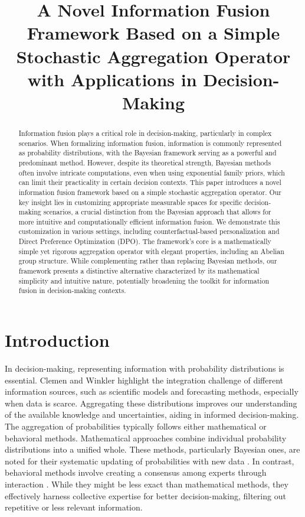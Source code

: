 \documentclass[letterpaper]{article} %
\title{A Novel Information Fusion Framework Based on a Simple Stochastic Aggregation Operator with Applications in Decision-Making}
\theoremstyle{definition}
\theoremstyle{remark}
\begin{document}
\maketitle

\begin{abstract}
Information fusion plays a critical role in decision-making, particularly in complex scenarios. When formalizing information fusion, information is commonly represented as probability distributions, with the Bayesian framework serving as a powerful and predominant method. However, despite its theoretical strength, Bayesian methods often involve intricate computations, even when using exponential family priors, which can limit their practicality in certain decision contexts. This paper introduces a novel information fusion framework based on a simple stochastic aggregation operator. Our key insight lies in customizing appropriate measurable spaces for specific decision-making scenarios, a crucial distinction from the Bayesian approach that allows for more intuitive and computationally efficient information fusion. We demonstrate this customization in various settings, including counterfactual-based personalization and Direct Preference Optimization (DPO). The framework's core is a mathematically simple yet rigorous aggregation operator with elegant properties, including an Abelian group structure. While complementing rather than replacing Bayesian methods, our framework presents a distinctive alternative characterized by its mathematical simplicity and intuitive nature, potentially broadening the toolkit for information fusion in decision-making contexts.
\end{abstract}


\section{Introduction}


In decision-making, representing information with probability distributions is essential. Clemen and Winkler\cite{clemen2007aggregating} highlight the integration challenge of different information sources, such as scientific models and forecasting methods, especially when data is scarce. Aggregating these distributions improves our understanding of the available knowledge and uncertainties, aiding in informed decision-making.  The aggregation of probabilities typically follows either mathematical or behavioral methods. Mathematical approaches combine individual probability distributions into a unified whole. These methods, particularly Bayesian ones, are noted for their systematic updating of probabilities with new data \cite{jouini1996copula,sklar1996random}. In contrast, behavioral methods involve creating a consensus among experts through interaction \cite{ferrell1985combining}. While they might be less exact than mathematical methods, they effectively harness collective expertise for better decision-making, filtering out repetitive or less relevant information. 
\end{document}
